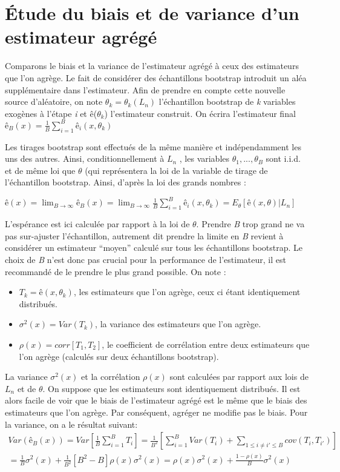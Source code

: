 \chapter{Étude du biais et de variance d'un estimateur agrégé \cite{ESL}}
	\begin{small}
	Comparons le biais et la variance de l’estimateur agrégé à ceux des estimateurs que l’on agrège.
	Le fait de considérer des échantillons bootstrap introduit un aléa supplémentaire dans l’estimateur. Afin de prendre en compte cette nouvelle source d’aléatoire, on note $\theta_k = \theta_k(L_n)$ l’échantillon bootstrap de \textit{k} variables exogènes à l’étape \textit{i} et ê($\theta_k$) l’estimateur construit. On écrira l'estimateur final ${ê_B(x) =  \frac{1}{B} \sum_{i=1}^{B} ê_i(x,\theta_k)}$
	\par
	Les tirages bootstrap sont effectués de la même manière et indépendamment les uns des autres.
	Ainsi, conditionnellement à $L_n$ , les variables $\theta_1,..., \theta_B$ sont i.i.d. et de même loi que $\theta$ (qui représentera la loi de la variable de tirage de l’échantillon bootstrap. Ainsi, d’après la loi des grands nombres :
	\begin{center}
		${ê(x) = \lim_{B \to \infty} ê_B(x) = \lim_{B \to \infty} \frac{1}{B} \sum_{i=1}^{B} ê_i(x,\theta_k) = E_\theta[ê(x,\theta) | L_n]  }$
	\end{center}
	L’espérance est ici calculée par rapport à la loi de $\theta$. Prendre \textit{B} trop grand ne va pas sur-ajuster l’échantillon, autrement dit prendre la limite en \textit{B} revient à considérer un estimateur “moyen” calculé sur tous les échantillons bootstrap. Le choix de \textit{B} n’est donc pas crucial pour la performance de l’estimateur, il est recommandé de le prendre le plus grand possible. On note :
	\begin{itemize}
	\item ${T_k=ê(x,\theta_k)}$, les estimateurs que l'on agrège, ceux ci étant identiquement distribués.
	\item ${\sigma^2(x) = Var (T_k)}$, la variance des estimateurs que l'on agrège.
	\item ${\rho(x) = corr[T_1,T_2]}$, le coefficient de corrélation entre deux estimateurs que l’on agrège (calculés sur deux échantillons bootstrap).
	\end{itemize}
	La variance ${\sigma^2(x)}$ et la corrélation ${\rho(x)}$ sont calculées par rapport aux lois de \textit{$L_n$} et de $\theta$. On suppose que les estimateurs sont identiquement distribués. Il est alors facile de voir que le biais
	de l’estimateur agrégé est le même que le biais des estimateurs que l’on agrège. Par conséquent,
	agréger ne modifie pas le biais. Pour la variance, on a le résultat suivant:
	\begin{equation*}
	\begin{split}	
	Var(ê_B(x)) = Var [ \frac{1}{B} \sum_{i=1}^{B} T_i] = \frac{1}{B^2} [\sum_{i=1}^{B} Var(T_i) + \sum_{1 \leq i \neq i' \leq B} cov(T_i,T_{i'}) ] \\ = \frac{1}{B}\sigma^2(x) + \frac{1}{B^2}[B^2-B]\rho(x)\sigma^2(x) = \rho(x)\sigma^2(x) + \frac{1-\rho(x)}{B}\sigma^2(x)
	\end{split}
	\end{equation*}


\end{small}
